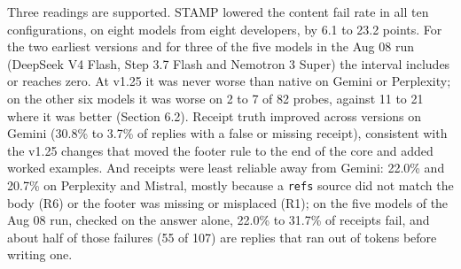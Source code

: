 \documentclass[
  11pt,
]{article}
\begin{document}
Three readings are supported. STAMP lowered the content fail rate in all
ten configurations, on eight models from eight developers, by 6.1 to
23.2 points. For the two earliest versions and for three of the five
models in the Aug 08 run (DeepSeek V4 Flash, Step 3.7 Flash and Nemotron
3 Super) the interval includes or reaches zero. At v1.25 it was never
worse than native on Gemini or Perplexity; on the other six models it
was worse on 2 to 7 of 82 probes, against 11 to 21 where it was better
(Section 6.2). Receipt truth improved across versions on Gemini (30.8\%
to 3.7\% of replies with a false or missing receipt), consistent with
the v1.25 changes that moved the footer rule to the end of the core and
added worked examples. And receipts were least reliable away from
Gemini: 22.0\% and 20.7\% on Perplexity and Mistral, mostly because a
\texttt{refs} source did not match the body (R6) or the footer was
missing or misplaced (R1); on the five models of the Aug 08 run, checked
on the answer alone, 22.0\% to 31.7\% of receipts fail, and about half
of those failures (55 of 107) are replies that ran out of tokens before
writing one.
\end{document}
